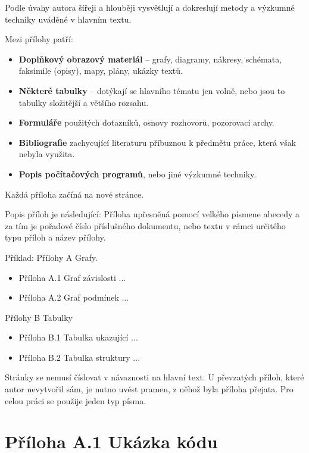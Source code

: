 \appendix
{}


{\color{infoBlue}
Podle úvahy autora šířeji a hlouběji vysvětlují a dokreslují metody a výzkumné techniky uváděné v hlavním textu. 

Mezi přílohy patří:
\begin{itemize}
    \item \textbf{Doplňkový obrazový materiál} – grafy, diagramy, nákresy, schémata, faksimile (opisy), mapy, plány, ukázky textů.
    \item \textbf{Některé tabulky} – dotýkají se hlavního tématu jen volně, nebo jsou to tabulky složitější a většího rozsahu.
    \item \textbf{Formuláře} použitých dotazníků, osnovy rozhovorů, pozorovací archy.
    \item \textbf{Bibliografie} zachycující literaturu příbuznou k předmětu práce, která však nebyla využita.
    \item \textbf{Popis počítačových programů}, nebo jiné výzkumné techniky.
\end{itemize}

Každá příloha začíná na nové stránce. 

Popis příloh je následující: Příloha upřesněná pomocí velkého písmene abecedy a za tím je pořadové číslo příslušného dokumentu, nebo textu v rámci určitého typu příloh a název přílohy.

Příklad: Přílohy A Grafy.
\begin{itemize}
    \item Příloha A.1 Graf závislosti ...
    \item Příloha A.2 Graf podmínek ...
\end{itemize}

Přílohy B Tabulky
\begin{itemize}
    \item Příloha B.1 Tabulka ukazující ...
    \item Příloha B.2 Tabulka struktury ...
\end{itemize}

Stránky se nemusí číslovat v návaznosti na hlavní text. U převzatých příloh, které autor nevytvořil sám, je nutno uvést pramen, z něhož byla příloha přejata. Pro celou práci se použije jeden typ písma. 
}

\pagebreak

\chapter*{Příloha A.1 Ukázka kódu}

